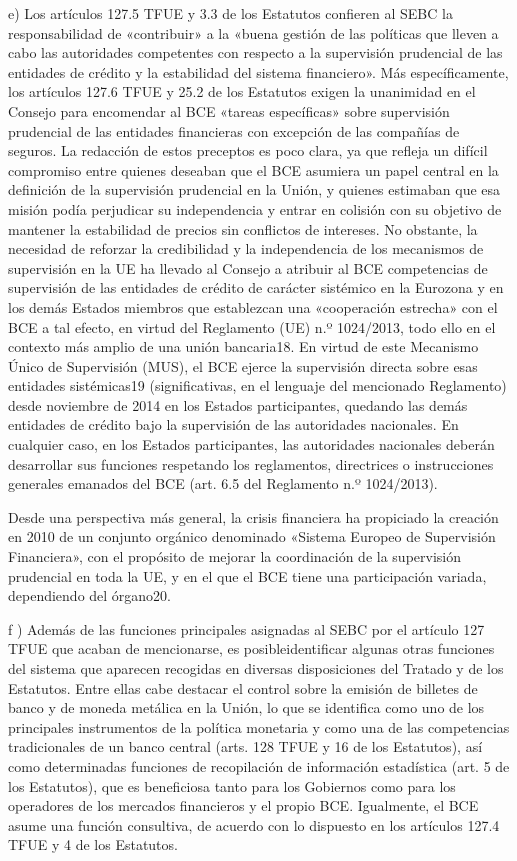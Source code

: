 \documentclass[10pt,a4paper]{article}
\begin{document}
e) Los artículos 127.5 TFUE y 3.3 de los Estatutos confieren al SEBC la responsabilidad de «contribuir» a la «buena gestión de las políticas que lleven a cabo las autoridades competentes con respecto a la supervisión prudencial de las entidades de crédito y la estabilidad del sistema financiero». Más específicamente, los artículos 127.6 TFUE y 25.2 de los Estatutos exigen la unanimidad en el Consejo para encomendar al BCE «tareas específicas» sobre supervisión prudencial de las entidades financieras con excepción de las compañías de seguros. La redacción de estos preceptos es poco clara, ya que refleja un difícil compromiso entre quienes deseaban que el BCE asumiera un papel central en la definición de la supervisión prudencial en la Unión, y quienes estimaban que esa misión podía perjudicar su independencia y entrar en colisión con su objetivo de mantener la estabilidad de precios sin conflictos de intereses. No obstante, la necesidad de reforzar la credibilidad y la independencia de los mecanismos de supervisión en la UE ha llevado al Consejo a atribuir al BCE competencias de supervisión de las entidades de crédito de carácter sistémico en la Eurozona y en los demás Estados miembros que establezcan una «cooperación estrecha» con el BCE a tal efecto, en virtud del Reglamento (UE) n.º 1024/2013, todo ello en el contexto más amplio de una unión bancaria18. En virtud de este Mecanismo Único de Supervisión (MUS), el BCE ejerce la supervisión directa sobre esas entidades sistémicas19 (significativas, en el lenguaje del mencionado Reglamento) desde noviembre de 2014 en los Estados participantes, quedando las demás entidades de crédito bajo la supervisión de las autoridades nacionales. En cualquier caso, en los Estados participantes, las autoridades nacionales deberán desarrollar sus funciones respetando los reglamentos, directrices o instrucciones generales emanados del BCE (art. 6.5 del Reglamento n.º 1024/2013).

Desde una perspectiva más general, la crisis financiera ha propiciado la creación en 2010 de un conjunto orgánico denominado «Sistema Europeo de Supervisión Financiera», con el propósito de mejorar la coordinación de la supervisión prudencial en toda la UE, y en el que el BCE tiene una participación variada, dependiendo del órgano20.

f ) Además de las funciones principales asignadas al SEBC por el artículo 127 TFUE que acaban de mencionarse, es posibleidentificar algunas otras funciones del sistema que aparecen recogidas en diversas disposiciones del Tratado y de los Estatutos. Entre ellas cabe destacar el control sobre la emisión de billetes de banco y de moneda metálica en la Unión, lo que se identifica como uno de los principales instrumentos de la política monetaria y como una de las competencias tradicionales de un banco central (arts. 128 TFUE y 16 de los Estatutos), así como determinadas funciones de recopilación de información estadística (art. 5 de los Estatutos), que es beneficiosa tanto para los Gobiernos como para los operadores de los mercados financieros y el propio BCE. Igualmente, el BCE asume una función consultiva, de acuerdo con lo dispuesto en los artículos 127.4 TFUE y 4 de los Estatutos.
\end{document}
